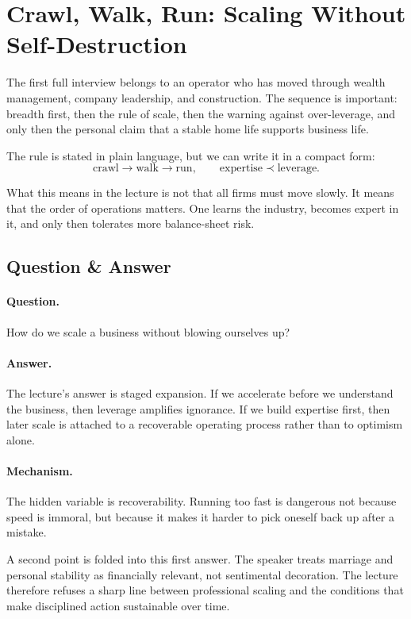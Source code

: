 \section{Crawl, Walk, Run: Scaling Without Self-Destruction}

The first full interview belongs to an operator who has moved through wealth management, company leadership, and construction. The sequence is important: breadth first, then the rule of scale, then the warning against over-leverage, and only then the personal claim that a stable home life supports business life.

The rule is stated in plain language, but we can write it in a compact form:
\begin{equation}
\text{crawl} \to \text{walk} \to \text{run},
\qquad
\text{expertise} \prec \text{leverage}.
\end{equation}

What this means in the lecture is not that all firms must move slowly. It means that the order of operations matters. One learns the industry, becomes expert in it, and only then tolerates more balance-sheet risk.

\subsection{Question \& Answer}

\paragraph{Question.} How do we scale a business without blowing ourselves up?

\paragraph{Answer.} The lecture's answer is staged expansion. If we accelerate before we understand the business, then leverage amplifies ignorance. If we build expertise first, then later scale is attached to a recoverable operating process rather than to optimism alone.

\paragraph{Mechanism.} The hidden variable is recoverability. Running too fast is dangerous not because speed is immoral, but because it makes it harder to pick oneself back up after a mistake.

A second point is folded into this first answer. The speaker treats marriage and personal stability as financially relevant, not sentimental decoration. The lecture therefore refuses a sharp line between professional scaling and the conditions that make disciplined action sustainable over time.

